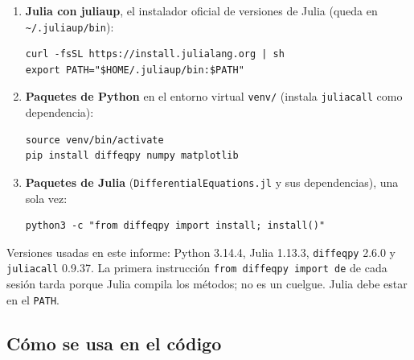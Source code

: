 \documentclass[11pt,a4paper]{article}
\begin{document}
\begin{enumerate}
    \item \textbf{Julia con juliaup}, el instalador oficial de versiones de Julia (queda en \verb|~/.juliaup/bin|):
\begin{verbatim}
curl -fsSL https://install.julialang.org | sh
export PATH="$HOME/.juliaup/bin:$PATH"
\end{verbatim}
    \item \textbf{Paquetes de Python} en el entorno virtual \texttt{venv/} (instala \texttt{juliacall} como dependencia):
\begin{verbatim}
source venv/bin/activate
pip install diffeqpy numpy matplotlib
\end{verbatim}
    \item \textbf{Paquetes de Julia} (\texttt{DifferentialEquations.jl} y sus dependencias), una sola vez:
\begin{verbatim}
python3 -c "from diffeqpy import install; install()"
\end{verbatim}
\end{enumerate}
Versiones usadas en este informe: Python 3.14.4, Julia 1.13.3, \texttt{diffeqpy} 2.6.0 y \texttt{juliacall} 0.9.37. La primera instrucción \texttt{from diffeqpy import de} de cada sesión tarda porque Julia compila los métodos; no es un cuelgue. Julia debe estar en el \texttt{PATH}.

\subsection{Cómo se usa en el código}
\end{document}
